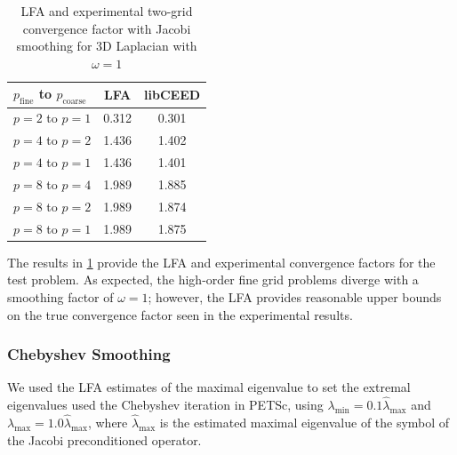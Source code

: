\documentclass[review]{siamart190516}
\begin{document}
\begin{table}[ht!]
\begin{center}
\begin{tabular}{l c c}
  \toprule
  $p_{\text{fine}}$ to $p_{\text{coarse}}$  &  LFA  &  libCEED  \\
  \toprule
  $p = 2$ to $p = 1$   &  0.312  &  0.301  \\
  \midrule
  $p = 4$ to $p = 2$   &  1.436  &  1.402  \\
  $p = 4$ to $p = 1$   &  1.436  &  1.401  \\
  \midrule
  $p = 8$ to $p = 4$   &  1.989  &  1.885  \\
  $p = 8$ to $p = 2$   &  1.989  &  1.874  \\
  $p = 8$ to $p = 1$   &  1.989  &  1.875  \\
  \bottomrule
\end{tabular}
\end{center}
\caption{LFA and experimental two-grid convergence factor with Jacobi smoothing for 3D Laplacian with $\omega = 1$}
\label{table:two_grid_3d_jacobi}
\end{table}

The results in \cref{table:two_grid_3d_jacobi} provide the LFA and experimental convergence factors for the test problem.
As expected, the high-order fine grid problems diverge with a smoothing factor of $\omega = 1$; however, the LFA provides reasonable upper bounds on the true convergence factor seen in the experimental results.

\subsubsection{Chebyshev Smoothing}

We used the LFA estimates of the maximal eigenvalue to set the extremal eigenvalues used the Chebyshev iteration in PETSc, using $\lambda_{\text{min}} = 0.1 \hat{\lambda}_{\text{max}}$ and $\lambda_{\text{max}} = 1.0 \hat{\lambda}_{\text{max}}$, where $\hat{\lambda}_{\text{max}}$ is the estimated maximal eigenvalue of the symbol of the Jacobi preconditioned operator.
\end{document}
